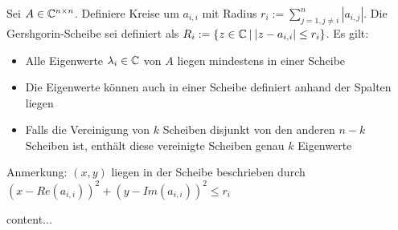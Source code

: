 \begin{satz}
	Sei $A \in \mathbb{C}^{n \times n}$. Definiere Kreise um $a_{i,i}$ mit Radius $r_i := \sum_{j = 1, j \neq i}^n |a_{i, j}|$. Die Gershgorin-Scheibe sei definiert als $R_i := \{z \in \mathbb{C} \medspace | \medspace |z -a_{i,i}| \leq r_i\}$. Es gilt:\begin{itemize}[noitemsep]
		\item Alle Eigenwerte $\lambda_i \in \mathbb{C} $ von $A$ liegen mindestens in einer Scheibe
		\item Die Eigenwerte können auch in einer Scheibe definiert anhand der Spalten liegen
		\item Falls die Vereinigung von $k$ Scheiben disjunkt von den anderen $n-k$ Scheiben ist, enthält diese vereinigte Scheiben genau $k$ Eigenwerte
	\end{itemize}

	Anmerkung: $(x,y)$ liegen in der Scheibe beschrieben durch $(x - Re(a_{i,i}))^2 + (y - Im(a_{i,i}))^2 \leq r_i$
\end{satz}


\begin{definition}[Ähnlichkeitsabbildung]
	content...
\end{definition}

